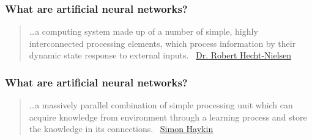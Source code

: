 \documentclass[xcolor=table]{beamer}
\begin{document}
\begin{mdframe}%

\frametitle{What are artificial neural networks?}\label{heading-sec-what-are-artificial-neural-networks}%

\noindent{}  %

\begin{quote}%

\noindent{}\dots{}a computing system made up of a number of simple, highly interconnected processing elements, which process information by their dynamic state response to external inputs.\mdbr
{}\textemdash{}~\href{https://en.wikipedia.org/wiki/Robert_Hecht-Nielsen}{Dr. Robert Hecht-Nielsen}%
\end{quote}%
\end{mdframe}\label{sec-what-are-artificial-neural-networks}%

\begin{mdframe}%

\frametitle{What are artificial neural networks?}\label{heading-sec-what-are-artificial-neural-networks}%

\begin{quote}%

\noindent{}\dots{}a massively parallel combination of simple processing unit which can acquire knowledge from environment through a learning process and store the knowledge in its connections. \mdbr
{}\textemdash{}~\href{https://www.eng.mcmaster.ca/ece/people/faculty/simon-haykin}{Simon Haykin}%
\end{quote}%
\end{mdframe}\label{sec-what-are-artificial-neural-networks}%
\end{document}
